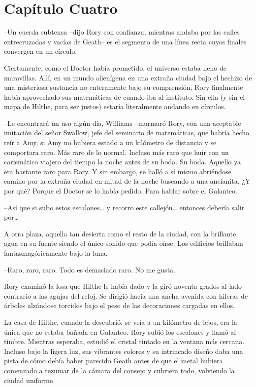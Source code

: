 \chapter*{Capítulo Cuatro}

{--Un cuerda subtensa --dijo Rory con confianza, mientras andaba por
	las calles entrecruzadas y vacías de Geath-- es el segmento de una línea
recta cuyos finales convergen en un círculo.}

{Ciertamente, como el Doctor había prometido, el universo estaba lleno
	de maravillas. Allí, en un mundo alienígena en una extraña ciudad bajo
	el hechizo de una misteriosa sustancia no enteramente bajo su
	comprensión, Rory finalmente había aprovechado sus matemáticas de cuando
	iba al instituto. Sin ella (y sin el mapa de Hilthe, para ser justos)
estaría literalmente andando en círculos.}

{--Le encontrará un uso algún día, Williams --murmuró Rory, con una
	aceptable imitación del señor Swallow, jefe del seminario de
	matemáticas, que habría hecho reír a Amy, si Amy no hubiera estado a un
	kilómetro de distancia y se comportara raro. Más raro de lo normal.
	Incluso más raro que huir con un carismático viajero del tiempo la noche
	antes de su boda. Su boda. Aquello ya era bastante raro para Rory. Y sin
	embargo, se halló a sí mismo abriéndose camino por la extraña ciudad en
	mitad de la noche buscando a una ancianita. ¿Y por qué? Porque el Doctor
se lo había pedido. Para hablar sobre el Galanteo.}

{--Así que si subo estos escalones\ldots{} y recorro este
	callejón\ldots{} entonces debería salir por\ldots{}}

{A otra plaza, aquella tan desierta como el resto de la ciudad, con la
	brillante agua en su fuente siendo el único sonido que podía oírse. Los
edificios brillaban fantasmagóricamente bajo la luna.}

{--Raro, raro, raro. Todo es demasiado raro. No me gusta.}

{Rory examinó la losa que Hilthe le había dado y la giró noventa grados
	al lado contrario a las agujas del reloj. Se dirigió hacia una ancha
	avenida con hileras de árboles alzándose torcidos bajo el peso de las
decoraciones cargadas en ellos.}

{La casa de Hilthe, cuando la descubrió, se veía a un kilómetro de
	lejos, era la única que no estaba bañada en Galanteo. Rory subió los
	escalones y llamó al timbre. Mientras esperaba, estudió el cristal
	tintado en la ventana más cercana. Incluso bajo la ligera luz, sus
	vibrantes colores y su intrincado diseño daba una pista de cómo debía
	haber parecido Geath antes de que el metal hubiera comenzado a rezumar
de la cámara del consejo y cubriera todo, volviendo la ciudad uniforme.}

